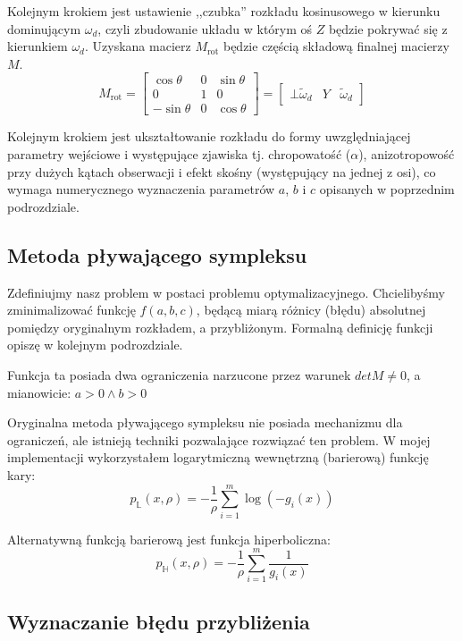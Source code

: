 \documentclass[../main.tex]{subfiles}
\begin{document}
Kolejnym krokiem jest ustawienie ,,czubka'' rozkładu kosinusowego w kierunku dominującym $\omega_d$, czyli zbudowanie układu w którym oś $Z$ będzie pokrywać się z kierunkiem $\omega_d$. Uzyskana macierz $M_{\text{rot}}$ będzie częścią składową finalnej macierzy $M$.
\[
M_{\text{rot}} =
\begin{bmatrix}
  \cos\theta  & 0     & \sin\theta \\
  0           & 1     & 0 \\
  -\sin\theta & 0     & \cos\theta
\end{bmatrix}
= \begin{bmatrix}
  \bot {\widetilde{\omega}_d} & Y & \widetilde{\omega}_d
\end{bmatrix}
\]

Kolejnym krokiem jest ukształtowanie rozkładu do formy uwzględniającej parametry wejściowe i występujące zjawiska tj. chropowatość ($\alpha$), anizotropowość przy dużych kątach obserwacji i efekt skośny (występujący na jednej z osi), co wymaga numerycznego wyznaczenia parametrów $a$, $b$ i $c$ opisanych w poprzednim podrozdziale.

\subsection{Metoda pływającego sympleksu}

Zdefiniujmy nasz problem w postaci problemu optymalizacyjnego. Chcielibyśmy zminimalizować funkcję $f(a,b,c)$, będącą miarą różnicy (błędu) absolutnej pomiędzy oryginalnym rozkładem, a przybliżonym. Formalną definicję funkcji opiszę w kolejnym podrozdziale.

Funkcja ta posiada dwa ograniczenia narzucone przez warunek $detM \neq 0$, a mianowicie:
  $a > 0 \wedge b > 0$

Oryginalna metoda pływającego sympleksu \cite{NelderMead65} nie posiada mechanizmu dla ograniczeń, ale istnieją techniki pozwalające rozwiązać ten problem. W mojej implementacji wykorzystałem logarytmiczną wewnętrzną (barierową) funkcję kary:
\[
  p_{\mathbb{L}}(x, \rho) = - \frac{1}{\rho} \sum_{i=1}^{m} \log(-g_i(x))
\]

Alternatywną funkcją barierową jest funkcja hiperboliczna:
\[
  p_{\mathbb{H}}(x, \rho) =
    - \frac{1}{\rho} \sum_{i=1}^{m} \frac{1}{g_i(x)}
\]

\subsection{Wyznaczanie błędu przybliżenia}
\end{document}
